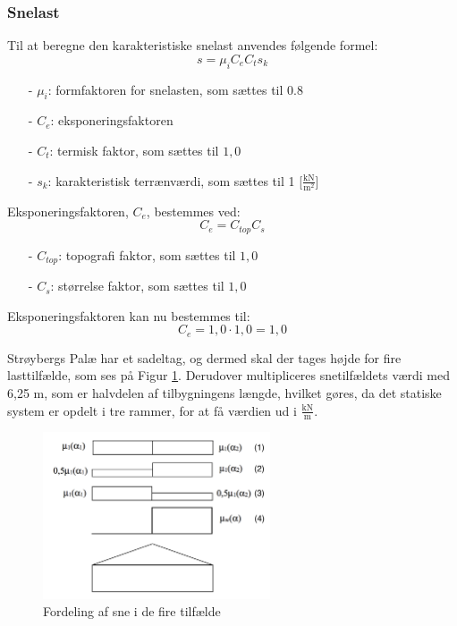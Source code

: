 \subsubsection{Snelast}
Til at beregne den karakteristiske snelast anvendes følgende formel:
\begin{equation}
	s=\mu_iC_eC_ts_k
\end{equation}
\begin{itemize}
	\item[-] $\mu_i$: formfaktoren for snelasten, som sættes til 0.8 \citep[ tabel 5.2 kapitel 5.3]{EU91}
	\item[-] $C_e$: eksponeringsfaktoren
	\item[-] $C_t$: termisk faktor, som sættes til $1,\!0$ \citep[ kapitel 5.2]{EU91}
	\item[-] $s_k$: karakteristisk terrænværdi, som sættes til 1 [$\frac{\text{kN}}{\text{m}^2}$] \citep[ kapitel 4.1]{EU91}
\end{itemize}

Eksponeringsfaktoren, $C_e$, bestemmes ved:
\begin{equation}
	C_e=C_{top}C_s
\end{equation}
\begin{itemize}
	\item[-] $C_{top}$: topografi faktor, som sættes til $1,\!0$ \citep[ tabel 5.1 kapitel 5.2]{EU91}
	\item[-] $C_s$: størrelse faktor, som sættes til $1,\!0$ \citep[ kapitel 5.2]{EU91}
\end{itemize}

Eksponeringsfaktoren kan nu bestemmes til:
\begin{equation}
	C_e = 1,\!0 \cdot 1,\!0 = 1,\!0
\end{equation}

Strøybergs Palæ har et sadeltag, og dermed skal der tages højde for fire lasttilfælde, som ses på Figur \ref{fig:sne}. Derudover multipliceres snetilfældets værdi med 6,25 m, som er halvdelen af tilbygningens længde, hvilket gøres, da det statiske system er opdelt i tre rammer, for at få værdien ud i $\frac{\text{kN}}{\text{m}}$.

\begin{figure}[htbp]
	\centering
	\includegraphics[width=0.6\textwidth]{billeder/snelasttilfaelde.png}
	\caption{Fordeling af sne i de fire tilfælde \citep[ kapitel 5.3.3]{EU91}}
	\label{fig:sne}
\end{figure}

